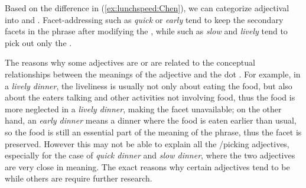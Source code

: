 \documentclass[output=paper,colorlinks,citecolor=brown,chinesefont]{langscibook}
\begin{document}

Based on the difference in (\ref{ex:lunchspeed:Chen}), we can categorize adjectival  into   and  . Facet-addressing  such as \emph{quick} or \emph{early} tend to keep the secondary facets in the phrase after modifying the , while   such as \emph{slow} and \emph{lively} tend to pick out only the . %

The reasons why some adjectives are  or  are related to the conceptual relationships between the meanings of the adjective and the dot . For example, in a \emph{lively dinner}, the liveliness is usually not only about eating the food, but also about the eaters talking and other activities not involving food, thus the food is more neglected in a \emph{lively dinner}, making the  facet unavailable; on the other hand, an \emph{early dinner} means a dinner where the food is eaten earlier than usual, so the food is still an essential part of the meaning of the phrase, thus the  facet is preserved. However this may not be able to explain all the /picking adjectives, especially for the case of \emph{quick dinner} and \emph{slow dinner}, where the two adjectives are very close in meaning. The exact reasons why certain adjectives tend to be  while others are  require further research.
\end{document}
